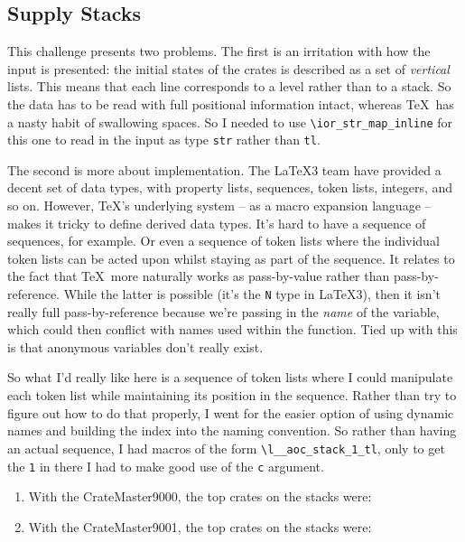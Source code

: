 \documentclass{article}
\begin{document}
\subsection{Supply Stacks}

This challenge presents two problems.
The first is an irritation with how the input is presented: the initial states of the crates is described as a set of \emph{vertical} lists.
This means that each line corresponds to a level rather than to a stack.
So the data has to be read with full positional information intact, whereas \TeX\ has a nasty habit of swallowing spaces.
So I needed to use \Verb!\ior_str_map_inline! for this one to read in the input as type \Verb!str! rather than \Verb!tl!.

The second is more about implementation.
The \LaTeX3 team have provided a decent set of data types, with property lists, sequences, token lists, integers, and so on.
However, \TeX's underlying system -- as a macro expansion language -- makes it tricky to define derived data types.
It's hard to have a sequence of sequences, for example.
Or even a sequence of token lists where the individual token lists can be acted upon whilst staying as part of the sequence.
It relates to the fact that \TeX\ more naturally works as pass-by-value rather than pass-by-reference.
While the latter is possible (it's the \Verb!N! type in \LaTeX3), then it isn't really full pass-by-reference because we're passing in the \emph{name} of the variable, which could then conflict with names used within the function.
Tied up with this is that anonymous variables don't really exist.

So what I'd really like here is a sequence of token lists where I could manipulate each token list while maintaining its position in the sequence.
Rather than try to figure out how to do that properly, I went for the easier option of using dynamic names and building the index into the naming convention.
So rather than having an actual sequence, I had macros of the form \Verb!\l__aoc_stack_1_tl!, only to get the \Verb!1! in there I had to make good use of the \Verb!c! argument.

\begin{enumerate}
\item With the CrateMaster9000, the top crates on the stacks were: 
\item With the CrateMaster9001, the top crates on the stacks were: 
\end{enumerate}
\end{document}
